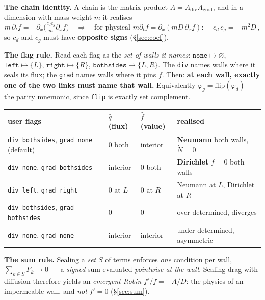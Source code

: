 \documentclass[10pt]{article}
\newcommand{\code}[1]{\texttt{#1}}
\newcommand{\hq}{\widehat{q}}
\newcommand{\hf}{\widehat{f}}
\begin{document}
\textbf{The chain identity.} A chain is the matrix product
$A=A_{\mathrm{div}}A_{\mathrm{grad}}$, and in a dimension with mass weight $m$ it
realises
\begin{equation}
  m\,\partial_t f = -\partial_x\!\Big(\tfrac{c_d c_g}{m}\partial_x f\Big)
  \quad\Longrightarrow\quad
  \text{for physical } m\partial_t f = \partial_x(mD\,\partial_x f):\quad
  \boxed{\,c_d\,c_g = -m^2 D\,,}
\label{eq:cardcoef}
\end{equation}
so $c_d$ and $c_g$ must have \textbf{opposite signs} (\S\ref{sec:coef}).

\textbf{The flag rule.} Read each flag as the \emph{set of walls it names}:
$\code{none}\mapsto\varnothing$, $\code{left}\mapsto\{L\}$,
$\code{right}\mapsto\{R\}$, $\code{bothsides}\mapsto\{L,R\}$. The \code{div}
names walls where it seals its flux; the \code{grad} names walls where it pins
$f$. Then: \textbf{at each wall, exactly one of the two links must name that
wall.} Equivalently $\varphi_g=\mathrm{flip}(\varphi_d)$ --- the parity mnemonic,
since \code{flip} is exactly set complement.

\begin{center}\small
\begin{tabular}{@{}llll@{}}
\toprule
user flags & $\hq$ (flux) & $\hf$ (value) & realised \\
\midrule
\code{div bothsides}, \code{grad none} (default) & $0$ both & interior & \textbf{Neumann} both walls, $\dot N=0$ \\
\code{div none}, \code{grad bothsides}           & interior & $0$ both & \textbf{Dirichlet} $f=0$ both walls \\
\code{div left}, \code{grad right}               & $0$ at $L$ & $0$ at $R$ & Neumann at $L$, Dirichlet at $R$ \\
\code{div bothsides}, \code{grad bothsides}      & $0$ & $0$ & over-determined, diverges \\
\code{div none}, \code{grad none}                & interior & interior & under-determined, asymmetric \\
\bottomrule
\end{tabular}
\end{center}

\textbf{The sum rule.} Sealing a \emph{set} $S$ of terms enforces \emph{one}
condition per wall, $\sum_{k\in S}F_k\to0$ --- a \emph{signed} sum evaluated
\emph{pointwise at the wall}. Sealing drag with diffusion therefore yields an
\emph{emergent Robin} $f'/f=-A/D$: the physics of an impermeable wall, and
\emph{not} $f'=0$ (\S\ref{sec:sum}).
\end{document}
